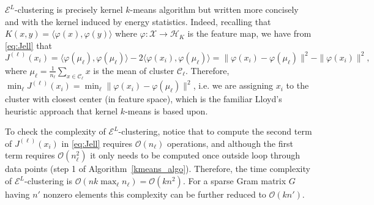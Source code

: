 \documentclass[aps,preprint,nofootinbib,floatfix]{revtex4-1}
\newcommand\kk{K}
\newcommand\C{{\mathcal{C}}}
\newcommand\OO{{\mathcal{O}}}
\begin{document}
$\mathcal{E}^{L}$-clustering is precisely
kernel $k$-means algorithm \cite{Dhillon2,Dhillon} 
but written more concisely and with the kernel induced by energy statistics. Indeed, recalling that
$\kk(x,y)=\langle \varphi(x), \varphi(y) \rangle$ where $\varphi: \mathcal{X}
\to \mathcal{H}_\kk$ is the feature map, we have from \eqref{eq:Jell} that
\begin{equation}
J^{(\ell)}(x_i) 
= 
\langle \varphi(\mu_\ell), \varphi(\mu_\ell) \rangle
-2 \langle \varphi(x_i), \varphi(\mu_\ell) \rangle 
= 
\| \varphi(x_i) - \varphi(\mu_\ell) \|^2 - \| \varphi(x_i) \|^2,
\end{equation}
where $\mu_\ell = \tfrac{1}{n_\ell} \sum_{x\in \C_\ell}x$ 
is the mean of cluster $\C_\ell$. 
Therefore, $\min_\ell J^{(\ell)}(x_i) = 
\min_\ell \| \varphi(x_i) - \varphi(\mu_\ell)\|^2$, i.e. we are assigning
$x_i$ to the cluster with closest center (in feature space),
which is the familiar Lloyd's
heuristic approach that kernel $k$-means is based upon.

To check the complexity of $\mathcal{E}^L$-clustering, 
notice that to compute the second term of $J^{(\ell)}(x_i)$
in \eqref{eq:Jell} requires
$\OO(n_\ell)$ operations, and although the first term requires
$\OO(n_\ell^2)$ it only needs to be computed once outside loop through
data points (step 1 of Algorithm~\ref{kmeans_algo}).
Therefore, the time complexity of $\mathcal{E}^L$-clustering 
is
$\OO(n k \max_\ell n_\ell) = \OO(k n^2)$. For a sparse
Gram matrix $G$ having
$n'$ nonzero elements this complexity can be further reduced
to $\OO(k n')$. 
\end{document}
